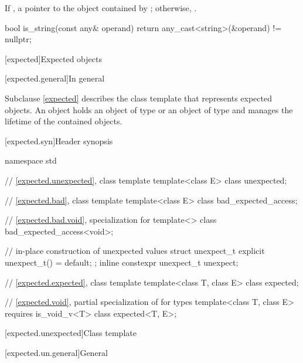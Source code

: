\begin{itemdescr}
\pnum
\returns
If ,
a pointer to the object contained by ;
otherwise, .

\pnum
\begin{example}
\begin{codeblock}
bool is_string(const any& operand) {
  return any_cast<string>(&operand) != nullptr;
}
\end{codeblock}
\end{example}
\end{itemdescr}

[expected]{Expected objects}
%

[expected.general]{In general}

\pnum
Subclause \ref{expected} describes the class template 
that represents expected objects.
An  object holds
an object of type  or an object of type  and
manages the lifetime of the contained objects.

[expected.syn]{Header  synopsis}

%
%
%
\begin{codeblock}
namespace std {
  // \ref{expected.unexpected}, class template 
  template<class E> class unexpected;

  // \ref{expected.bad}, class template 
  template<class E> class bad_expected_access;

  // \ref{expected.bad.void}, specialization for 
  template<> class bad_expected_access<void>;

  // in-place construction of unexpected values
  struct unexpect_t {
    explicit unexpect_t() = default;
  };
  inline constexpr unexpect_t unexpect{};

  // \ref{expected.expected}, class template 
  template<class T, class E> class expected;

  // \ref{expected.void}, partial specialization of  for  types
  template<class T, class E> requires is_void_v<T> class expected<T, E>;
}
\end{codeblock}

[expected.unexpected]{Class template }

[expected.un.general]{General}

